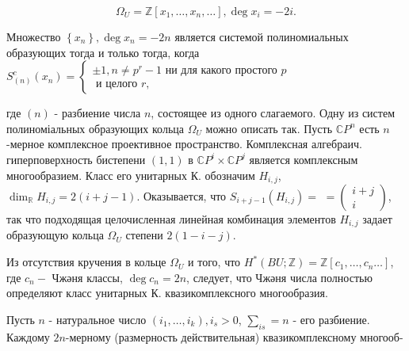 \documentclass[10pt]{article}
\begin{document}
\[

\Omega_{U}=\mathbb{Z}\left[x_{1}, \ldots, x_{n}, \ldots\right], \operatorname{deg} x_{i}=-2 i .

\]



Множество $\left\{x_{n}\right\}, \operatorname{deg} x_{n}=-2 n$ является системой полиномиальных образующих тогда и только тогда, когда $S_{(n)}^{c}\left(x_{n}\right)=\left\{\begin{array}{l} \pm 1, n \neq p^{r}-1 \text { ни для какого простого } p \\ \text { и целого } r,\end{array}\right.$



где $(n)$ - разбиение числа $n$, состоящее из одного слагаемого. Одну из систем полиноміальных образующих кольца $\Omega_{U}$ можно описать так. Пусть $\mathbb{C} P^{n}$ есть $n$-мерное комплексное проективное пространство. Комплексная алгебраич. гиперповерхность бистепени $(1,1)$ в $\mathbb{C} P^{i} \times \mathbb{C} P^{j}$ является комплексным многообразием. Класс его унитарных $К$. обозначим $H_{i, j}$, $\operatorname{dim}_{\mathbb{R}} H_{i, j}=2(i+j-1)$. Оказывается, что $S_{i+j-1}\left(H_{i, j}\right)=$ $=\left(\begin{array}{l}i+j \\ i\end{array}\right)$, так что подходящая целочисленная линейная комбинация элементов $H_{i, j}$ задает образующую кольца $\Omega_{U}$ степени $2(1-i-j)$.



Из отсутствия кручения в кольце $\Omega_{U}$ и того, что $H^{*}(B U ; \mathbb{Z})=\mathbb{Z}\left[c_{1}, \ldots, c_{n} \ldots\right]$, где $c_{n}-$ Чжәня классы, $\operatorname{deg} c_{n}=2 n$, следует, что Чжәня числа полностью определяют класс унитарных К. квазикомплексного многообразия.



Пусть $n$ - натуральное число $\left(i_{1}, \ldots, i_{k}\right), i_{s}>0$, $\sum_{i s}=n$ - его разбиение. Каждому $2 n$-мерному (размерность действительная) квазикомплексному многооб-
\end{document}
